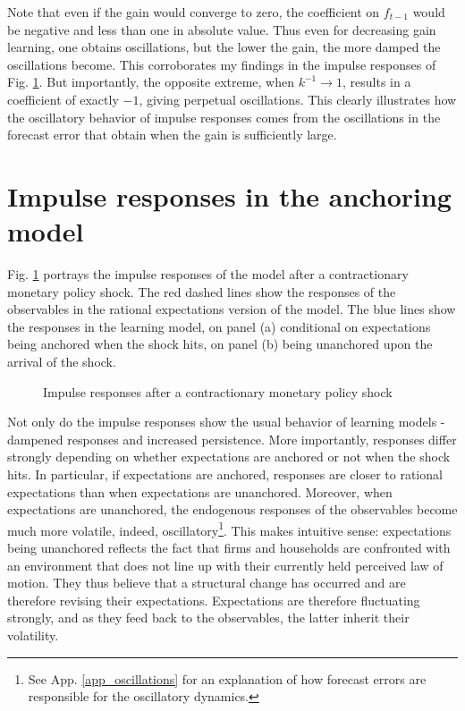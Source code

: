 \documentclass[11pt]{article}
\def \myFigPath {../../figures/}
\renewcommand{\[}{\begin{equation}}
\renewcommand{\]}{\end{equation}}
\def\mySmallerFigScale{0.18}
\def\fignameIRFanchored{command_IFS_anchoring_pretty_RIR_LH_anch_monpol_again_critCUSUM_constant_only_T_400_N_1000_burnin_5_params_psi_pi_1_5_psi_x_0_gbar_0_145_thetbar_16_thettilde_2_5_kap_0_8_lamx_0_lami_0_date_2020_06_05}
\def\fignameIRFunanchored{command_IFS_anchoring_pretty_RIR_LH_unanch_monpol_again_critCUSUM_constant_only_T_400_N_1000_burnin_5_params_psi_pi_1_5_psi_x_0_gbar_0_145_thetbar_16_thettilde_2_5_kap_0_8_lamx_0_lami_0_date_2020_06_05}
\begin{document}
Note that even if the gain would converge to zero, the coefficient on $f_{t-1}$ would be negative and less than one in absolute value. Thus even for decreasing gain learning, one obtains oscillations, but the lower the gain, the more damped the oscillations become. This corroborates my findings in the impulse responses of Fig. \ref{IRF}. But importantly, the opposite extreme, when $k^{-1}\rightarrow 1$, results in a coefficient of exactly $-1$, giving perpetual oscillations. This clearly illustrates how the oscillatory behavior of impulse responses comes from the oscillations in the forecast error that obtain when the gain is sufficiently large. 

\section{Impulse responses in the anchoring model}\label{app_IRFs}
Fig. \ref{IRF} portrays the impulse responses of the model after a contractionary monetary policy shock. The red dashed lines show the responses of the observables in the rational expectations version of the model. The blue lines show the responses in the learning model, on panel (a) conditional on expectations being anchored when the shock hits, on panel (b) being unanchored upon the arrival of the shock. 

\begin{figure}[h!]
\caption{Impulse responses after a contractionary monetary policy shock}
\label{IRF}
\end{figure}

Not only do the impulse responses show the usual behavior of learning models - dampened responses and increased persistence. More importantly, responses differ strongly depending on whether expectations are anchored or not when the shock hits. In particular, if expectations are anchored, responses are closer to rational expectations than when expectations are unanchored. Moreover, when expectations are unanchored, the endogenous responses of the observables become much more volatile, indeed, oscillatory\footnote{See App. \ref{app_oscillations} for an explanation of how forecast errors are responsible for the oscillatory dynamics.}. This makes intuitive sense: expectations being unanchored reflects the fact that firms and households are confronted with an environment that does not line up with their currently held perceived law of motion. They thus believe that a structural change has occurred and are therefore revising their expectations. Expectations are therefore fluctuating strongly, and as they feed back to the observables, the latter inherit their volatility. 
\end{document}

